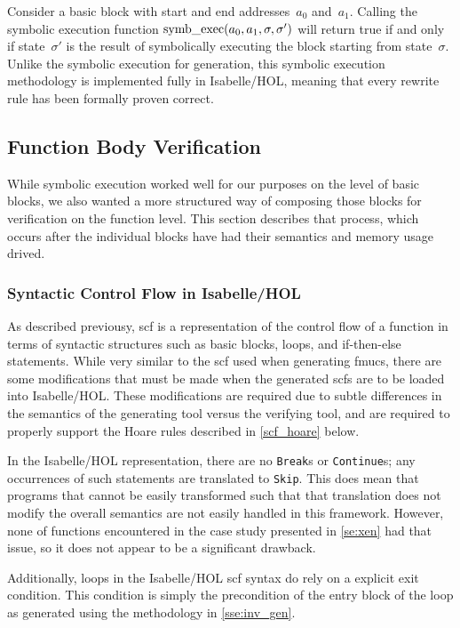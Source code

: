 Consider a basic block with start and end addresses~$a_0$ and~$a_1$.
Calling the symbolic execution function $\operatorname{symb\_exec}(a_0,a_1,\sigma,\sigma')$
will return true if and only if state~$\sigma'$ is the result of
symbolically executing the block starting from state~$\sigma$.
Unlike the symbolic execution for generation,
this symbolic execution methodology is implemented fully in Isabelle/HOL,
meaning that every rewrite rule has been formally proven correct.
\begin{example}
\end{example}

\subsection{Function Body Verification}
While symbolic execution worked well for our purposes on the level of basic blocks,
we also wanted a more structured way of composing those blocks
for verification on the function level. This section describes that process,
which occurs after the individual blocks have had their semantics
and memory usage drived.

\subsubsection{Syntactic Control Flow in Isabelle/HOL}\label{isabelle_scf}
As described previousy, \acl{scf} is a representation of the control flow of a function
in terms of syntactic structures such as basic blocks,
loops, and if-then-else statements.
While very similar to the \ac{scf} used when generating \acp{fmuc},
there are some modifications that must be made when the generated \acp{scf}
are to be loaded into Isabelle/HOL.
These modifications are required due to subtle differences in the semantics
of the generating tool versus the verifying tool,
and are required to properly support the Hoare rules
described in \cref{scf_hoare} below.

In the Isabelle/HOL representation,
there are no \texttt{Break}s or \texttt{Continue}s;
any occurrences of such statements are translated to \texttt{Skip}.
This does mean that programs that cannot be easily transformed
such that that translation does not modify the overall semantics
are not easily handled in this framework.
However, none of functions encountered in the case study presented in \cref{se:xen}
had that issue, so it does not appear to be a significant drawback.

Additionally, loops in the Isabelle/HOL \ac{scf} syntax
do rely on a explicit exit condition.
This condition is simply the precondition of the entry block of the loop
as generated using the methodology in \cref{sse:inv_gen}.

